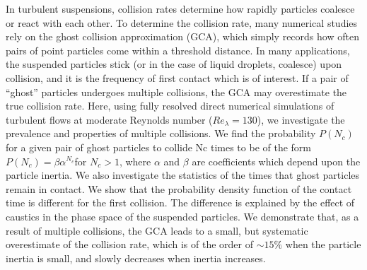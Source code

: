 In turbulent suspensions, collision rates determine how rapidly particles coalesce or react with each other.
To determine the collision rate, many numerical studies rely on the ghost collision approximation (GCA), which simply records how often pairs of point particles come within a threshold distance.
In many applications, the suspended particles stick (or in the case of liquid droplets, coalesce) upon collision, and it is the frequency of first contact which is of interest.
If a pair of “ghost” particles undergoes multiple collisions, the GCA may overestimate the true collision rate.
Here, using fully resolved direct numerical simulations of turbulent flows at moderate Reynolds number ($Re_\lambda = 130$), we investigate the prevalence and properties of multiple collisions.
We find the probability $P(N_c)$ for a given pair of ghost particles to collide Nc times to be of the form $P(N_c) = \beta \alpha^{N_c}$for $N_c>1$, where $\alpha$ and $\beta$ are coefficients which depend upon the particle inertia.
We also investigate the statistics of the times that ghost particles remain in contact.
We show that the probability density function of the contact time is different for the first collision.
The difference is explained by the effect of caustics in the phase space of the suspended particles.
We demonstrate that, as a result of multiple collisions, the GCA leads to a small, but systematic overestimate of the collision rate, which is of the order of $\sim 15\%$ when the particle inertia is small, and slowly decreases when inertia increases.
